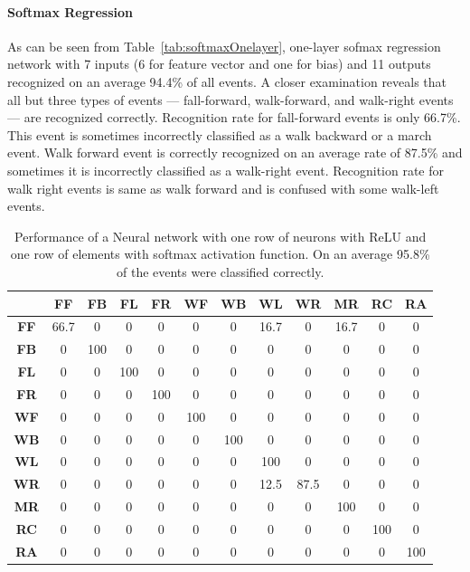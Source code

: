 \documentclass[]{IEEEtran}
\begin{document}
 \paragraph{Softmax Regression} \label{sec:SoftmaxRegression} As can be seen
from Table~\ref{tab:softmaxOnelayer}, one-layer sofmax regression network with
7 inputs (6 for feature vector and one for bias) and 11 outputs recognized on
an average 94.4\% of all  events. A closer examination reveals that all but
three types of events --- fall-forward, walk-forward, and walk-right events
--- are recognized correctly. Recognition rate for fall-forward events is only
66.7\%. This event is sometimes  incorrectly classified as a walk backward or a
march event. Walk forward event is correctly recognized on an average rate of
87.5\% and sometimes it is incorrectly classified as a walk-right event.
Recognition rate for walk right events is same as walk forward and is confused
with  some  walk-left events.  \begin{table}[htb] \caption{Performance of a
Neural network with one row of neurons with ReLU and one row of elements with
softmax activation function. On an average 95.8\% of the events were classified
correctly.} \label{tbl:neuralNetworkOneLayer}
\resizebox{\columnwidth}{!}
{
\begin{tabular}{|c|c|c|c|c|c|c|c|c|c|c|c|}
\hline 
& \textbf{FF} & \textbf{FB}  & \textbf{FL} & \textbf{FR} &  \textbf{WF} & 
\textbf{WB} & \textbf{WL} & \textbf{WR} & \textbf{MR} & 
\textbf{RC} & \textbf{RA} \\ \hline
\textbf{FF} & 66.7 &  0 &  0 &  0 &  0 &  0 &  16.7 &  0 &  16.7 &  0 &  0 \\ \hline
\textbf{FB} & 0 &  100 &  0 &  0 &  0 &  0 &  0 &  0 &  0 &  0 &  0 \\ \hline
\textbf{FL} & 0 &  0 &  100 &  0 &  0 &  0 &  0 &  0 &  0 &  0 &  0 \\ \hline
\textbf{FR} & 0 &  0 &  0 &  100 &  0 &  0 &  0 &  0 &  0 &  0 &  0 \\ \hline
\textbf{WF} & 0 &  0 &  0 &  0 &  100 &  0 &  0 &  0 &  0 &  0 &  0 \\ \hline
\textbf{WB} & 0 &  0 &  0 &  0 &  0 &  100 &  0 &  0 &  0 &  0 &  0 \\ \hline
\textbf{WL} & 0 &  0 &  0 &  0 &  0 &  0 &  100 &  0 &  0 &  0 &  0 \\ \hline
\textbf{WR} & 0 &  0 &  0 &  0 &  0 &  0 &  12.5 &  87.5 &  0 &  0 &  0 \\ \hline
\textbf{MR} & 0 &  0 &  0 &  0 &  0 &  0 &  0 &  0 &  100 &  0 &  0 \\ \hline
\textbf{RC} & 0 &  0 &  0 &  0 &  0 &  0 &  0 &  0 &  0 &  100 &  0 \\ \hline
\textbf{RA} & 0 &  0 &  0 &  0 &  0 &  0 &  0 &  0 &  0 &  0 &  100 \\ \hline
\end{tabular}
}
\end{table}
\end{document}
